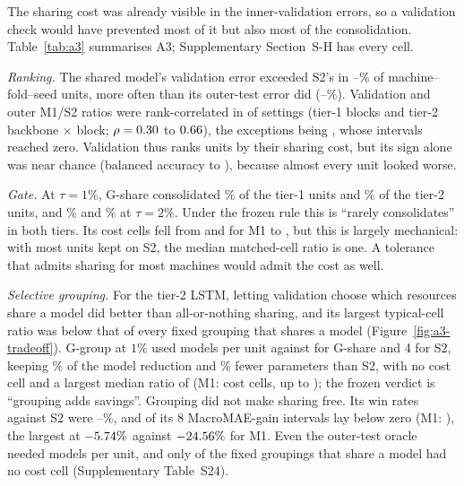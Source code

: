 \documentclass[5p,twocolumn]{elsarticle}
\begin{document}
The sharing cost was already visible in the inner-validation errors, so a
validation check would have prevented most of it but also most of the
consolidation. Table~\ref{tab:a3} summarises A3; Supplementary Section~S-H
has every cell.

\emph{Ranking.} The shared model's validation error exceeded S2's in
\AiiiValWorseMin--\AiiiValWorseMax\% of machine--fold--seed units, more often
than its outer-test error did (\AiiiOutWorseMin--\AiiiOutWorseMax\%).
Validation and outer M1/S2 ratios were rank-correlated in \AiiiDetects{} of
\AiiiFrames{} settings (tier-1 blocks and tier-2 backbone $\times$ block;
$\rho=0.30$ to $0.66$), the exceptions being
\AiiiNotDetected{}, whose intervals reached zero. Validation thus ranks units
by their sharing cost, but its sign alone was near chance (balanced accuracy
\AiiiBAMin{} to \AiiiBAMax{}), because almost every unit looked worse.

\emph{Gate.} At $\tau=1\%$, G-share consolidated \AiiiRetainedOne\% of the
\AiiiUnitsOne{} tier-1 units and \AiiiRetainedTwo\% of the \AiiiUnitsTwo{}
tier-2 units, and \AiiiRetainedTwoPctOne\% and \AiiiRetainedTwoPctTwo\% at
$\tau=2\%$. Under the frozen rule this is ``rarely consolidates'' in both
tiers. Its cost cells fell from \AiiiRefCostOne{} and \AiiiRefCostTwo{} for
M1 to \AiiiCostOne{}, but this is largely mechanical: with most units kept on
S2, the median matched-cell ratio is one. A tolerance that admits sharing for
most machines would admit the cost as well.

\emph{Selective grouping.} For the tier-2 LSTM, letting validation choose
which resources share a model did better than all-or-nothing sharing, and its
largest typical-cell ratio was below that of every fixed grouping that shares
a model (Figure~\ref{fig:a3-tradeoff}). G-group
at $1\%$ used \AiiiGroupModels{} models per unit against \AiiiShareModelsLSTM{}
for G-share and 4 for S2, keeping \AiiiGroupRetained\% of the model reduction
and \AiiiGroupParamCut\% fewer parameters than S2, with no cost cell and a
largest median ratio of \AiiiGroupMaxRatio{} (M1: \AiiiMOneCostLSTM{} cost
cells, up to \AiiiMOneMaxRatio{}); the frozen verdict is ``grouping adds
savings''. Grouping did not make sharing free. Its win rates against S2 were
\AiiiGroupWinMin--\AiiiGroupWinMax\%, and \AiiiGroupMacroBelow{} of its 8
MacroMAE-gain intervals lay below zero (M1: \AiiiMOneMacroBelow{}), the
largest at $-5.74\%$ against $-24.56\%$ for M1. Even
the outer-test oracle needed \AiiiOracleModels{} models per unit, and only
\AiiiFixedNoCost{} of the \AiiiFixedShared{} fixed groupings that share a model
had no cost cell (Supplementary Table~S24).
\end{document}

